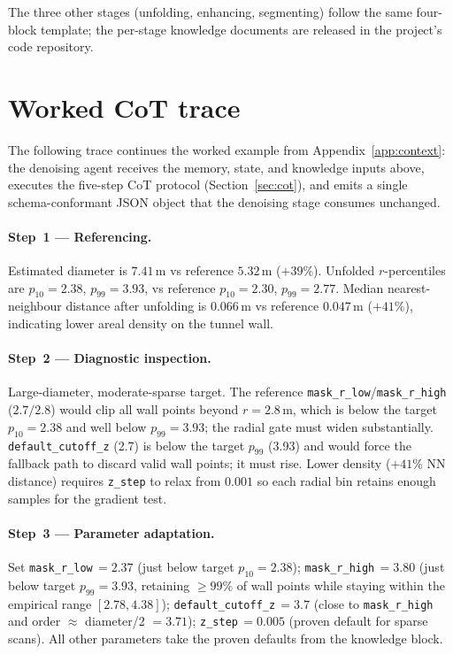 The three other stages (unfolding, enhancing, segmenting) follow the same four-block template; the per-stage knowledge documents are released in the project's code repository.

\section{Worked CoT trace}\label{app:cot}

The following trace continues the worked example from Appendix~\ref{app:context}: the denoising agent receives the memory, state, and knowledge inputs above, executes the five-step CoT protocol (Section~\ref{sec:cot}), and emits a single schema-conformant JSON object that the denoising stage consumes unchanged.

\paragraph{Step~1 --- Referencing.}
Estimated diameter is $7.41$\,m vs reference $5.32$\,m ($+39\%$). Unfolded $r$-percentiles are $p_{10}=2.38$, $p_{99}=3.93$, vs reference $p_{10}=2.30$, $p_{99}=2.77$. Median nearest-neighbour distance after unfolding is $0.066$\,m vs reference $0.047$\,m ($+41\%$), indicating lower areal density on the tunnel wall.

\paragraph{Step~2 --- Diagnostic inspection.}
Large-diameter, moderate-sparse target. The reference \texttt{mask\_r\_low}/\texttt{mask\_r\_high} ($2.7/2.8$) would clip all wall points beyond $r=2.8$\,m, which is below the target $p_{10}=2.38$ and well below $p_{99}=3.93$; the radial gate must widen substantially. \texttt{default\_cutoff\_z} (2.7) is below the target $p_{99}$ (3.93) and would force the fallback path to discard valid wall points; it must rise. Lower density ($+41\%$ NN distance) requires \texttt{z\_step} to relax from $0.001$ so each radial bin retains enough samples for the gradient test.

\paragraph{Step~3 --- Parameter adaptation.}
Set \texttt{mask\_r\_low}\,$=2.37$ (just below target $p_{10}=2.38$); \texttt{mask\_r\_high}\,$=3.80$ (just below target $p_{99}=3.93$, retaining $\geq 99\%$ of wall points while staying within the empirical range $[2.78, 4.38]$); \texttt{default\_cutoff\_z}\,$=3.7$ (close to \texttt{mask\_r\_high} and order $\approx$ diameter/2 $= 3.71$); \texttt{z\_step}\,$=0.005$ (proven default for sparse scans). All other parameters take the proven defaults from the knowledge block.

